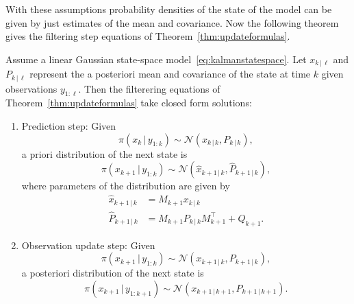 With these assumptions probability densities of the state of the model can be given by just estimates of the mean and covariance.
Now the following theorem gives the filtering step equations of Theorem~\ref{thm:updateformulas}.
\begin{theorem}
    Assume a linear Gaussian state-space model~\eqref{eq:kalmanstatespace}.
    Let $x_{k\,\vert\,\ell}$ and $P_{k\,\vert\,\ell}$ represent the a posteriori mean and covariance of the state at time $k$ given observations $y_{1:\ell}$.
    Then the filterering equations of Theorem~\ref{thm:updateformulas} take closed form solutions:
    \begin{enumerate}
        \item 
            Prediction step:
            Given
            \begin{equation*}
                \pi (x_k \, \vert \, y_{1:k}) \sim \mathcal{N}(x_{k\,\vert\,k}, P_{k\,\vert\,k}),
            \end{equation*}
            a priori distribution of the next state is
            \begin{equation*}
                \pi (x_{k+1} \, \vert \,  y_{1:k}) \sim \mathcal{N}(\hat{x}_{k+1\,\vert\,k}, \hat{P}_{k+1\,\vert\,k}),
            \end{equation*}
            where parameters of the distribution are given by
            \begin{subequations}\label{eq:kalmanpredictionstep}
                \begin{align}
                    \hat{x}_{k+1\,\vert\,k} &= M_{k+1}x_{k\,\vert\,k}\\
                    \hat{P}_{k+1\,\vert\,k} &= M_{k+1}P_{k\,\vert\,k}M_{k+1}^{\top} + Q_{k+1}.
                \end{align}
            \end{subequations}
        \item
            Observation update step:
            Given
            \begin{equation*}
                 \pi (x_{k+1} \, \vert \,  y_{1:k}) \sim \mathcal{N}(x_{k+1\,\vert\,k}, P_{k+1\,\vert\,k}),
            \end{equation*}
            a posteriori distribution of the next state is
            \begin{equation*}
                 \pi (x_{k+1} \, \vert \,  y_{1:k+1}) \sim \mathcal{N}(x_{k+1\,\vert\,k+1}, P_{k+1\,\vert\,k+1}).
            \end{equation*}

\end{enumerate}
\end{theorem}
